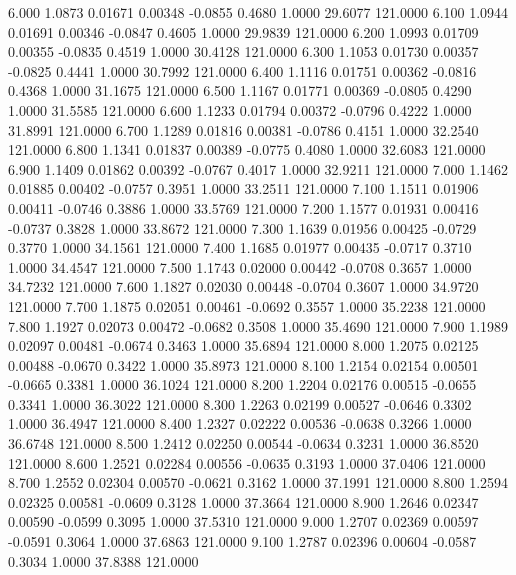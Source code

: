    6.000   1.0873   0.01671   0.00348  -0.0855   0.4680   1.0000  29.6077 121.0000
   6.100   1.0944   0.01691   0.00346  -0.0847   0.4605   1.0000  29.9839 121.0000
   6.200   1.0993   0.01709   0.00355  -0.0835   0.4519   1.0000  30.4128 121.0000
   6.300   1.1053   0.01730   0.00357  -0.0825   0.4441   1.0000  30.7992 121.0000
   6.400   1.1116   0.01751   0.00362  -0.0816   0.4368   1.0000  31.1675 121.0000
   6.500   1.1167   0.01771   0.00369  -0.0805   0.4290   1.0000  31.5585 121.0000
   6.600   1.1233   0.01794   0.00372  -0.0796   0.4222   1.0000  31.8991 121.0000
   6.700   1.1289   0.01816   0.00381  -0.0786   0.4151   1.0000  32.2540 121.0000
   6.800   1.1341   0.01837   0.00389  -0.0775   0.4080   1.0000  32.6083 121.0000
   6.900   1.1409   0.01862   0.00392  -0.0767   0.4017   1.0000  32.9211 121.0000
   7.000   1.1462   0.01885   0.00402  -0.0757   0.3951   1.0000  33.2511 121.0000
   7.100   1.1511   0.01906   0.00411  -0.0746   0.3886   1.0000  33.5769 121.0000
   7.200   1.1577   0.01931   0.00416  -0.0737   0.3828   1.0000  33.8672 121.0000
   7.300   1.1639   0.01956   0.00425  -0.0729   0.3770   1.0000  34.1561 121.0000
   7.400   1.1685   0.01977   0.00435  -0.0717   0.3710   1.0000  34.4547 121.0000
   7.500   1.1743   0.02000   0.00442  -0.0708   0.3657   1.0000  34.7232 121.0000
   7.600   1.1827   0.02030   0.00448  -0.0704   0.3607   1.0000  34.9720 121.0000
   7.700   1.1875   0.02051   0.00461  -0.0692   0.3557   1.0000  35.2238 121.0000
   7.800   1.1927   0.02073   0.00472  -0.0682   0.3508   1.0000  35.4690 121.0000
   7.900   1.1989   0.02097   0.00481  -0.0674   0.3463   1.0000  35.6894 121.0000
   8.000   1.2075   0.02125   0.00488  -0.0670   0.3422   1.0000  35.8973 121.0000
   8.100   1.2154   0.02154   0.00501  -0.0665   0.3381   1.0000  36.1024 121.0000
   8.200   1.2204   0.02176   0.00515  -0.0655   0.3341   1.0000  36.3022 121.0000
   8.300   1.2263   0.02199   0.00527  -0.0646   0.3302   1.0000  36.4947 121.0000
   8.400   1.2327   0.02222   0.00536  -0.0638   0.3266   1.0000  36.6748 121.0000
   8.500   1.2412   0.02250   0.00544  -0.0634   0.3231   1.0000  36.8520 121.0000
   8.600   1.2521   0.02284   0.00556  -0.0635   0.3193   1.0000  37.0406 121.0000
   8.700   1.2552   0.02304   0.00570  -0.0621   0.3162   1.0000  37.1991 121.0000
   8.800   1.2594   0.02325   0.00581  -0.0609   0.3128   1.0000  37.3664 121.0000
   8.900   1.2646   0.02347   0.00590  -0.0599   0.3095   1.0000  37.5310 121.0000
   9.000   1.2707   0.02369   0.00597  -0.0591   0.3064   1.0000  37.6863 121.0000
   9.100   1.2787   0.02396   0.00604  -0.0587   0.3034   1.0000  37.8388 121.0000
